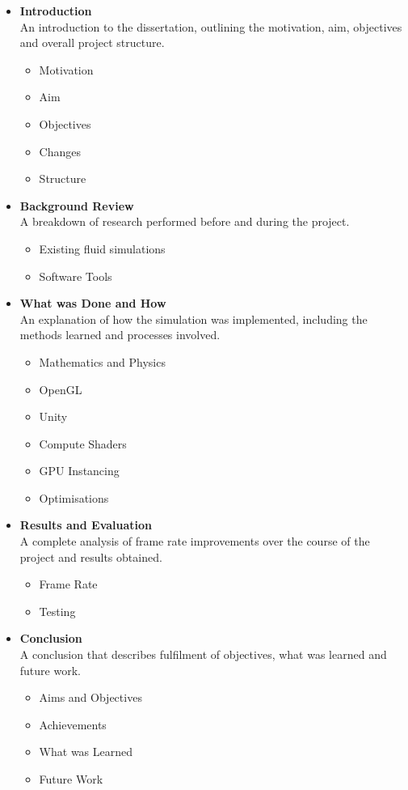 \documentclass[12pt]{article}
\begin{document}
    \begin{itemize}
        \item \textbf{Introduction} \\
        An introduction to the dissertation, outlining the motivation, aim, objectives and overall project structure. 
        \begin{itemize}
            \item Motivation
            \item Aim
            \item Objectives
            \item Changes
            \item Structure
        \end{itemize}
        \item \textbf{Background Review} \\
        A breakdown of research performed before and during the project.
        \begin{itemize}
            \item Existing fluid simulations
            \item Software Tools
        \end{itemize}
        \item \textbf{What was Done and How} \\
        An explanation of how the simulation was implemented, including the methods learned and processes involved.
        \begin{itemize}
            \item Mathematics and Physics
            \item OpenGL
            \item Unity
            \item Compute Shaders
            \item GPU Instancing
            \item Optimisations
        \end{itemize}
        \item \textbf{Results and Evaluation} \\
        A complete analysis of frame rate improvements over the course of the project and results obtained.
        \begin{itemize}
            \item Frame Rate
            \item Testing
        \end{itemize}
        \item \textbf{Conclusion} \\
        A conclusion that describes fulfilment of objectives, what was learned and future work.
        \begin{itemize}
            \item Aims and Objectives
            \item Achievements
            \item What was Learned
            \item Future Work
        \end{itemize}
    \end{itemize}
\end{document}
